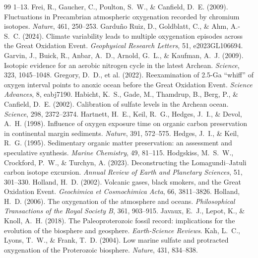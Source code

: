 \documentclass[11pt]{article}
\begin{document}
\begin{thebibliography}{99}
1--13.
 Frei, R., Gaucher, C., Poulton, S.~W., \& Canfield, D.~E.
(2009). Fluctuations in Precambrian atmospheric oxygenation recorded by chromium isotopes.
\textit{Nature}, 461, 250--253.
 Gardu\~{n}o Ruiz, D., Goldblatt, C., \& Ahm,
A.-S.~C. (2024). Climate variability leads to multiple oxygenation episodes across the Great
Oxidation Event. \textit{Geophysical Research Letters}, 51, e2023GL106694.
 Garvin, J., Buick, R., Anbar, A.~D., Arnold, G.~L., \&
Kaufman, A.~J. (2009). Isotopic evidence for an aerobic nitrogen cycle in the latest Archean.
\textit{Science}, 323, 1045--1048.
 Gregory, D.~D., et al. (2022). Reexamination of
2.5-Ga ``whiff'' of oxygen interval points to anoxic ocean before the Great Oxidation Event.
\textit{Science Advances}, 8, eabj7190.
 Habicht, K.~S., Gade, M., Thamdrup, B., Berg, P., \&
Canfield, D.~E. (2002). Calibration of sulfate levels in the Archean ocean. \textit{Science}, 298,
2372--2374.
 Hartnett, H.~E., Keil, R.~G., Hedges, J.~I., \& Devol,
A.~H. (1998). Influence of oxygen exposure time on organic carbon preservation in continental
margin sediments. \textit{Nature}, 391, 572--575.
 Hedges, J.~I., \& Keil, R.~G. (1995). Sedimentary organic
matter preservation: an assessment and speculative synthesis. \textit{Marine Chemistry}, 49,
81--115.
 Hodgskiss, M.~S.~W., Crockford, P.~W., \& Turchyn,
A. (2023). Deconstructing the Lomagundi--Jatuli carbon isotope excursion. \textit{Annual Review of
Earth and Planetary Sciences}, 51, 301--330.
 Holland, H.~D. (2002). Volcanic gases, black smokers, and the
Great Oxidation Event. \textit{Geochimica et Cosmochimica Acta}, 66, 3811--3826.
 Holland, H.~D. (2006). The oxygenation of the atmosphere and
oceans. \textit{Philosophical Transactions of the Royal Society B}, 361, 903--915.
 Javaux, E.~J., Lepot, K., \& Knoll, A.~H. (2018). The
Paleoproterozoic fossil record: implications for the evolution of the biosphere and geosphere.
\textit{Earth-Science Reviews}.
 Kah, L.~C., Lyons, T.~W., \& Frank, T.~D. (2004). Low marine
sulfate and protracted oxygenation of the Proterozoic biosphere. \textit{Nature}, 431, 834--838.

\end{thebibliography}
\end{document}
